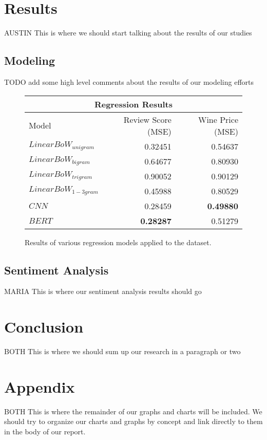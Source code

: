 \documentclass[11pt,english]{article}
\begin{document}
\section{Results}
    AUSTIN
    This is where we should start talking about the results of our studies

\subsection{Modeling}
    TODO add some high level comments about the results of our modeling efforts

    \begin{figure}
    \centering
    \begin{tabular}{ |l||r|r|  }
        \hline
        \multicolumn{3}{|c|}{Regression Results} \\
        \hline
        Model& Review Score (MSE) & Wine Price (MSE) \\
        \hline
        $Linear BoW_{unigram}$   & 0.32451          & 0.54637 \\
        $Linear BoW_{bigram}$    & 0.64677          & 0.80930 \\
        $Linear BoW_{trigram}$   & 0.90052          & 0.90129 \\
        $Linear BoW_{1-3gram}$   & 0.45988          & 0.80529 \\
        \hline
        $CNN$                    & 0.28459          & \textbf{0.49880} \\
        \hline
        $BERT$                   & \textbf{0.28287} & 0.51279 \\
        \hline
    \end{tabular}
    \caption{ Results of various regression models applied to the dataset. }
    \end{figure}

\subsection{Sentiment Analysis}
    MARIA
    This is where our sentiment analysis results should go

\section{Conclusion}
    BOTH
    This is where we should sum up our research in a paragraph or two

\newpage
\section{Appendix}
    BOTH
    This is where the remainder of our graphs and charts will be included. We should try to organize our charts and graphs by concept and link directly to them in the body of our report.
\end{document}
